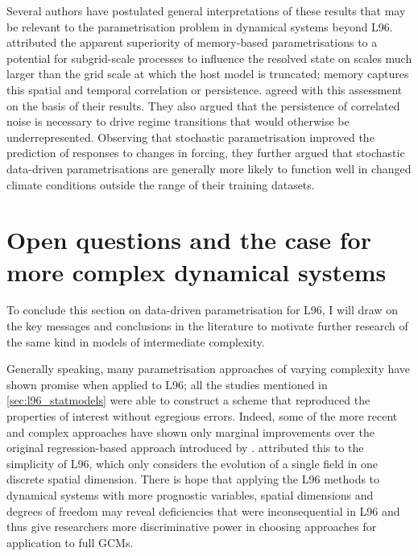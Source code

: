 \documentclass[../main.tex]{subfiles}
\begin{document}
Several authors have postulated general interpretations of these results that
may be relevant to the parametrisation problem in dynamical systems beyond L96.
\textcite{arnold2013} attributed the apparent superiority of memory-based
parametrisations to a potential for subgrid-scale processes to influence the
resolved state on scales much larger than the grid scale at which the host
model is truncated; memory captures this spatial and temporal correlation or
persistence. \textcite{christensen2015} agreed with this assessment on the
basis of their results. They also argued that the persistence of correlated
noise is necessary to drive regime transitions that would otherwise be
underrepresented. Observing that stochastic parametrisation improved the
prediction of responses to changes in forcing, they further argued that
stochastic data-driven parametrisations are generally more likely to function
well in changed climate conditions outside the range of their training
datasets.


\section{Open questions and the case for more complex dynamical systems}
To conclude this section on data-driven parametrisation for L96, I will draw on
the key messages and conclusions in the literature to motivate further research
of the same kind in models of intermediate complexity.

Generally speaking, many parametrisation approaches of varying complexity have
shown promise when applied to L96; all the studies mentioned in
\cref{sec:l96_statmodels} were able to construct a scheme that reproduced the
properties of interest without egregious errors. Indeed, some of the more
recent and complex approaches have shown only marginal improvements over the
original regression-based approach introduced by \textcite{wilks2005}.
\textcite{gagne2020} attributed this to the simplicity of L96, which only
considers the evolution of a single field in one discrete spatial dimension.
There is hope that applying the L96 methods to dynamical systems with more
prognostic variables, spatial dimensions and degrees of freedom may reveal
deficiencies that were inconsequential in L96 and thus give researchers more
discriminative power in choosing approaches for application to full GCMs.
\end{document}
